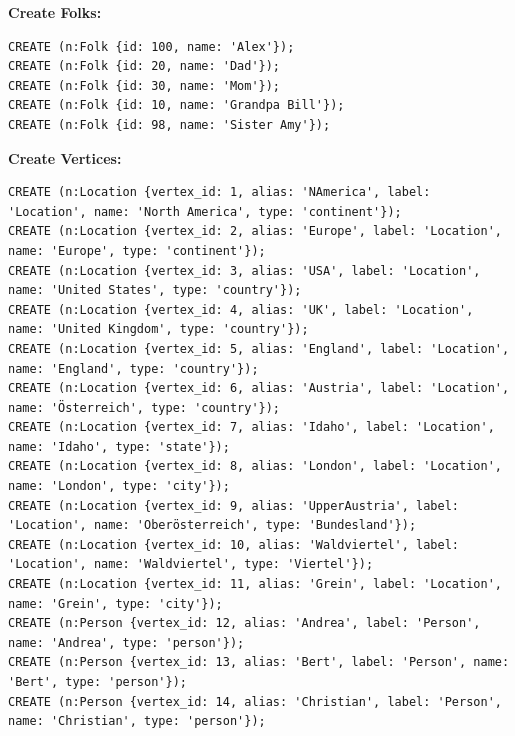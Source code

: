\documentclass[14pt,a4paper]{extarticle}
\begin{document}
	\noindent \textbf{Create Folks:}
	\begin{lstlisting}[style=sql]
CREATE (n:Folk {id: 100, name: 'Alex'});
CREATE (n:Folk {id: 20, name: 'Dad'});
CREATE (n:Folk {id: 30, name: 'Mom'});
CREATE (n:Folk {id: 10, name: 'Grandpa Bill'});
CREATE (n:Folk {id: 98, name: 'Sister Amy'});
	\end{lstlisting}

	\noindent \textbf{Create Vertices:}
	\begin{lstlisting}[style=sql]
CREATE (n:Location {vertex_id: 1, alias: 'NAmerica', label: 'Location', name: 'North America', type: 'continent'});
CREATE (n:Location {vertex_id: 2, alias: 'Europe', label: 'Location', name: 'Europe', type: 'continent'});
CREATE (n:Location {vertex_id: 3, alias: 'USA', label: 'Location', name: 'United States', type: 'country'});
CREATE (n:Location {vertex_id: 4, alias: 'UK', label: 'Location', name: 'United Kingdom', type: 'country'});
CREATE (n:Location {vertex_id: 5, alias: 'England', label: 'Location', name: 'England', type: 'country'});
CREATE (n:Location {vertex_id: 6, alias: 'Austria', label: 'Location', name: 'Österreich', type: 'country'});
CREATE (n:Location {vertex_id: 7, alias: 'Idaho', label: 'Location', name: 'Idaho', type: 'state'});
CREATE (n:Location {vertex_id: 8, alias: 'London', label: 'Location', name: 'London', type: 'city'});
CREATE (n:Location {vertex_id: 9, alias: 'UpperAustria', label: 'Location', name: 'Oberösterreich', type: 'Bundesland'});
CREATE (n:Location {vertex_id: 10, alias: 'Waldviertel', label: 'Location', name: 'Waldviertel', type: 'Viertel'});
CREATE (n:Location {vertex_id: 11, alias: 'Grein', label: 'Location', name: 'Grein', type: 'city'});
CREATE (n:Person {vertex_id: 12, alias: 'Andrea', label: 'Person', name: 'Andrea', type: 'person'});
CREATE (n:Person {vertex_id: 13, alias: 'Bert', label: 'Person', name: 'Bert', type: 'person'});
CREATE (n:Person {vertex_id: 14, alias: 'Christian', label: 'Person', name: 'Christian', type: 'person'});
	\end{lstlisting}

	\pagebreak
\end{document}
